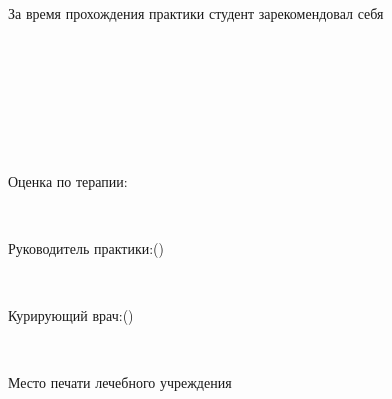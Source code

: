 \documentclass[a4paper,14pt]{extarticle}
\begin{document}
~\hrulefill 

~\hrulefill 

~\hrulefill 

~\hrulefill 

~\hrulefill 

~\hrulefill

~\hrulefill

~\hrulefill

~\hrulefill

~

За время прохождения практики студент зарекомендовал себя \hrulefill 

~\hrulefill 

~\hrulefill 

~\hrulefill 

~

Оценка по терапии: \hrulefill

~

Руководитель практики:\hrulefill (\hrulefill)

~

Курирующий врач:\hrulefill (\hrulefill)

~

Место печати лечебного учреждения
\end{document}
